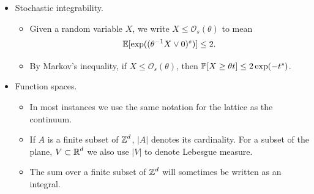 \documentclass[12pt]{amsart}
\numberwithin{equation}{section}
\begin{document}
\begin{itemize}
\begin{itemize}
			\item A {\it bi-infinite path} is an injective function $\gamma: \Z \to \Z^2$  with $|\gamma(i+1) - \gamma(i)| = 1$.
			\item A {\it loop} is a finite path such that $|\gamma(1) - \gamma(\mathrm{end})| = 1$ and we define $\gamma(\mathrm{end}+1) = \gamma(1)$. We overload notation and consider paths and loops both as functions and as subsets of $\Z^d$.
			\item Given two vertices $x , y \in \Zd$ (resp. $x , y \in \mathscr{C}_\infty$), we define the distance $\dist(x , y)$ (resp. $\dist_{\mathscr{C}_\infty}(x , y)$) to be the length of the shortest path connecting $x$ and $y$ in $\Zd$ (resp. in $\mathscr{C}_\infty$). We similarly define the distance between two edges of $E(\Zd)$ (resp. $E(\mathscr{C}_\infty)$) and the distance between a vertex and an edge.
			\item In Section~\ref{sec:toppling-invariants}, we specifically work in two dimensions, and define each of the prior objects on the plane $\R^2$ and the Euclidean sphere $\mathbb{S}^2 \subseteq \R^3$ in the same way, by simply defining a path on~$\R^2$ to be the linear interpolation of a path on~$\Z^2$ (and mapping $\R^2$ to $\mathbb{S}^2$ through the stereographic projection).
			\item A Jordan curve in $\R^2$ or $\mathbb{S}^2$ is a set which is homeomorphic to the circle $\mathbb{S}^1 \subseteq \R^2$.
		\end{itemize}
		\item Stochastic integrability.
		\begin{itemize}
			\item  Given a random variable $X$, we write $X \leq \mathcal{O}_s(\theta)$ to mean \[ \E[ \exp( (\theta^{-1} X \vee 0)^s)] \leq 2. \]
			\item By Markov's inequality, if $X \leq \mathcal{O}_s(\theta)$, then $\P[X \geq \theta t] \leq 2 \exp(-t^s)$.
		\end{itemize}
		\item Function spaces.
		\begin{itemize}
			\item In most instances we use the same notation for the lattice as the continuum. 
			\item If $A$ is a finite subset of $\Z^d$, $|A|$ denotes its cardinality. For a subset of the plane,  
			$V \subset \R^d$ we also use $|V|$ to denote Lebesgue measure. 
			\item The sum over a finite subset of $\Z^d$ will sometimes be written as an integral.

\end{itemize}
\end{itemize}
\end{document}

